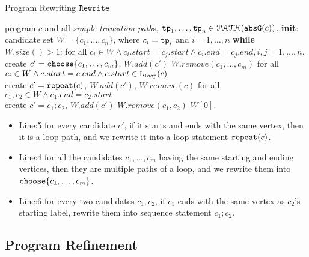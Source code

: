 \begin{algorithm}
  \caption{Program Rewriting $\mathtt{Rewrite}$}
  \label{alg:alg-refine_rewrite}
  \begin{algorithmic}[1]
    \REQUIRE program $c$ and all \emph{simple transition path}s, $\mathtt{tp}_1, \ldots, \mathtt{tp}_n \in \mathcal{PATH}(\mathtt{abs}{\mathtt{G}}(c))$.
    \STATE \textbf{init}: candidate set $W = \{c_1, \ldots, c_n\}$, where $c_i = \mathtt{tp}_i$ and $i = 1, \ldots, n$
    \STATE \textbf{while} $W.size()> 1$:
    \STATE \quad 
    for all $c_i \in W \land c_i.start = c_j.start \land c_i.end = c_j.end, i, j = 1, \ldots, n$.
    \\ \quad create $c' = \rpchoose{c_1, \ldots, c_m}$, \qquad  $W.add(c')$ \qquad $W.remove(c_1, \ldots, c_m)$
    \STATE
    \quad for all $c_i \in W \land c.start = c.end \land c.start \in \mathtt{L}_{\mathtt{loop}}(c)$
    \\ \quad create $c' = \mathtt{repeat}(c)$, \qquad $W.add(c')$, \qquad $W.remove(c)$
    \STATE \quad for all $c_1, c_2 \in W \land c_1.end = c_2.start$
    \\
    \quad create $c' = c_1; c_2$, \quad $W.add(c')$ \qquad $W.remove(c_1, c_2)$
    \RETURN $W[0]$.
  \end{algorithmic}
  \end{algorithm}
%

\begin{itemize}
  \item
  Line:5 for every candidate $c'$, if it starts and ends with the same vertex, 
      then it is a loop path, and we rewrite it into a loop statement
      $\mathtt{repeat}(c)$.
  \item
  Line:4 for all the candidates $c_1, \ldots, c_m$ having the same starting and ending vertices, 
   then they are multiple paths of a loop, and we rewrite them into 
   $\rpchoose{c_1, \ldots, c_m}$.
   \item
   Line:6 for every two candidates $c_1, c_2$, if $c_1$ ends with the same vertex as $c_2$'s starting label, rewrite them into sequence statement
   $c_1; c_2$.
  \end{itemize}

\subsection{Program Refinement}

